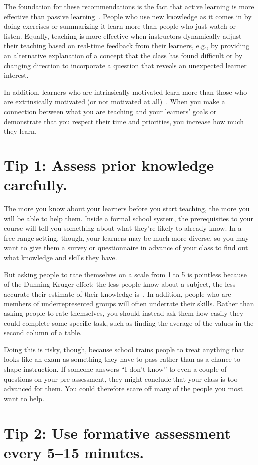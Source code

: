 \documentclass[10pt,letterpaper]{article}
\newcommand{\rulemajor}[1]{\section{#1}}
\begin{document}
The foundation for these recommendations is the fact that
active learning is more effective than passive learning~\cite{Ambr2010,HPL2}.
People who use new knowledge as it comes in by doing exercises or summarizing it
learn more than people who just watch or listen.
Equally,
teaching is more effective when instructors dynamically adjust their teaching
based on real-time feedback from their learners,
e.g.,
by providing an alternative explanation of a concept that the class has found difficult
or by changing direction to incorporate a question that reveals an unexpected learner interest.

In addition,
learners who are intrinsically motivated learn more than those who are extrinsically motivated
(or not motivated at all)~\cite{Wlod2017}.
When you make a connection between what you are teaching and your learners' goals
or demonstrate that you respect their time and priorities,
you increase how much they learn.

\rulemajor{Tip 1: Assess prior knowledge---carefully.}

The more you know about your learners before you start teaching,
the more you will be able to help them.
Inside a formal school system,
the prerequisites to your course will tell you something about
what they're likely to already know.
In a free-range setting,
though,
your learners may be much more diverse,
so you may want to give them a survey or questionnaire in advance of your class
to find out what knowledge and skills they have.

But asking people to rate themselves on a scale from 1 to 5 is pointless
because of the Dunning-Kruger effect:
the less people know about a subject,
the less accurate their estimate of their knowledge is~\cite{Krug1999}.
In addition,
people who are members of underrepresented groups will often underrate their skills.
Rather than asking people to rate themselves,
you should instead ask them how easily they could complete some specific task,
such as finding the average of the values in the second column of a table.

Doing this is risky,
though,
because school trains people
to treat anything that looks like an exam as something they have to pass
rather than as a chance to shape instruction.
If someone answers ``I don't know'' to even a couple of questions on your pre-assessment,
they might conclude that your class is too advanced for them.
You could therefore scare off many of the people you most want to help.

\rulemajor{Tip 2: Use formative assessment every 5--15 minutes.}
\end{document}
